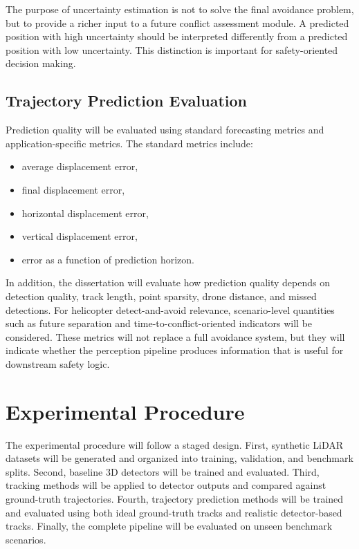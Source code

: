 The purpose of uncertainty estimation is not to solve the final avoidance problem, but to provide a richer input to a future conflict assessment module. A predicted position with high uncertainty should be interpreted differently from a predicted position with low uncertainty. This distinction is important for safety-oriented decision making.

\subsection{Trajectory Prediction Evaluation}

Prediction quality will be evaluated using standard forecasting metrics and application-specific metrics. The standard metrics include:

\begin{itemize}
\item average displacement error,
\item final displacement error,
\item horizontal displacement error,
\item vertical displacement error,
\item error as a function of prediction horizon.
\end{itemize}

In addition, the dissertation will evaluate how prediction quality depends on detection quality, track length, point sparsity, drone distance, and missed detections. For helicopter detect-and-avoid relevance, scenario-level quantities such as future separation and time-to-conflict-oriented indicators will be considered. These metrics will not replace a full avoidance system, but they will indicate whether the perception pipeline produces information that is useful for downstream safety logic.

\section{Experimental Procedure}

The experimental procedure will follow a staged design. First, synthetic LiDAR datasets will be generated and organized into training, validation, and benchmark splits. Second, baseline 3D detectors will be trained and evaluated. Third, tracking methods will be applied to detector outputs and compared against ground-truth trajectories. Fourth, trajectory prediction methods will be trained and evaluated using both ideal ground-truth tracks and realistic detector-based tracks. Finally, the complete pipeline will be evaluated on unseen benchmark scenarios.

